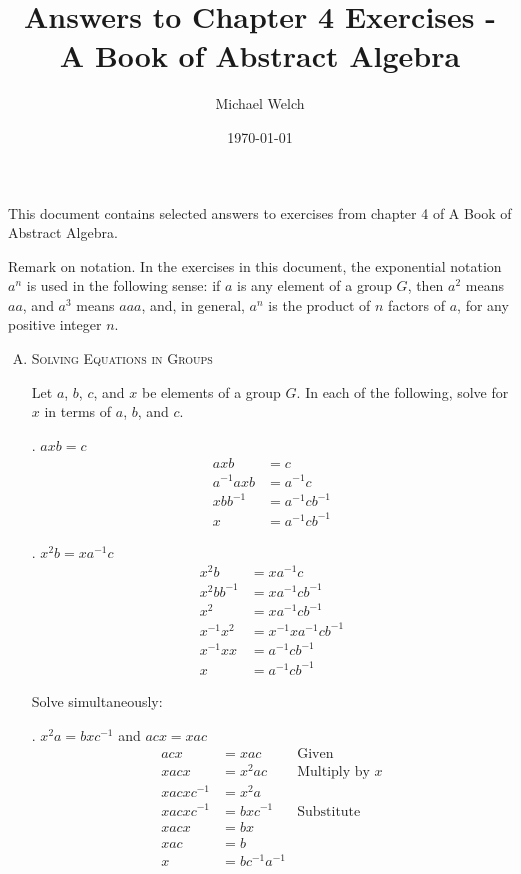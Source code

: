 \documentclass[twoside]{amsart}
\begin{document}
\title{Answers to Chapter 4 Exercises - A Book of Abstract Algebra}
\author{Michael Welch}
\date{\today}
\maketitle

This document contains selected answers to exercises from chapter 4
of A Book of Abstract Algebra.

Remark on notation. In the exercises in this document, the exponential
notation $a^n$ is used in the following sense: if $a$ is any element of
a group $G$, then $a^2$ means $aa$, and $a^3$ means $aaa$, and, in
general, $a^n$ is the product of $n$ factors of $a$, for any positive
integer $n$.

\begin{enumerate}[A.]
   \item \textsc{Solving Equations in Groups}

   \noindent Let $a$, $b$, $c$, and $x$ be elements of a group $G$. In each of
   the following, solve for $x$ in terms of $a$, $b$, and $c$.

   . $axb = c$
      \begin{align*}
         axb & = c \\
	 a^{-1}axb & = a^{-1}c \\
	 xbb^{-1} & = a^{-1}cb^{-1} \\
	 x & = a^{-1}cb^{-1}
      \end{align*}

   . $x^2b = xa^{-1}c$
      \begin{align*}
         x^2b & = xa^{-1}c    \\
	 x^2bb^{-1} & = xa^{-1}cb^{-1} \\
	 x^2        & = xa^{-1}cb^{-1} \\
	 x^{-1}x^2  & = x^{-1}xa^{-1}cb^{-1}\\
	 x^{-1}xx   & = a^{-1}cb^{-1} \\
	 x          & = a^{-1}cb^{-1}
      \end{align*}

   Solve simultaneously:

   . $x^2a = bxc^{-1}$ and $acx = xac$
   \begin{align*}
      acx & = xac      & \text{Given} \\
      xacx & = x^2ac   & \text{Multiply by $x$} \\
      xacxc^{-1} & = x^2a \\
      xacxc^{-1} & = bxc^{-1} & \text{Substitute} \\
      xacx       & = bx  \\
      xac        & = b  \\
      x          & = bc^{-1}a^{-1}
   \end{align*}


\end{enumerate}
\end{document}
